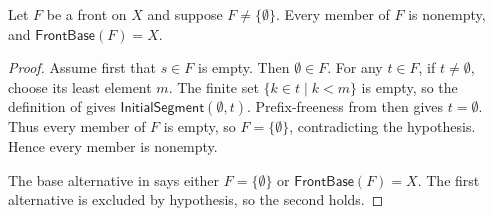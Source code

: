 \begin{helper}
Let $F$ be a front on $X$ and suppose $F\ne\{\emptyset\}$.  Every member
of $F$ is nonempty, and $\mathsf{FrontBase}(F)=X$.
\end{helper}
\begin{proof}
Assume first that $s\in F$ is empty.  Then $\emptyset\in F$.  For any
$t\in F$, if $t\ne\emptyset$, choose its least element $m$.  The finite
set $\{k\in t\mid k<m\}$ is empty, so the definition of
 gives
$\mathsf{InitialSegment}(\emptyset,t)$.  Prefix-freeness from
 then gives $t=\emptyset$.  Thus every member of $F$ is
empty, so $F=\{\emptyset\}$, contradicting the hypothesis.  Hence every
member is nonempty.

The base alternative in  says either
$F=\{\emptyset\}$ or $\mathsf{FrontBase}(F)=X$.  The first alternative is
excluded by hypothesis, so the second holds.
\end{proof}
